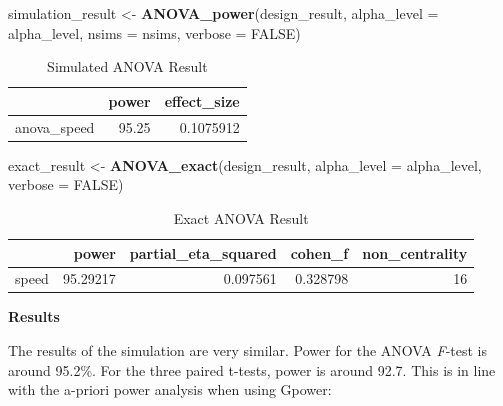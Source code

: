 \documentclass[
]{book}
\newenvironment{Shaded}{\begin{snugshade}}{\end{snugshade}}
\newcommand{\DataTypeTok}[1]{\textcolor[rgb]{0.13,0.29,0.53}{#1}}
\newcommand{\KeywordTok}[1]{\textcolor[rgb]{0.13,0.29,0.53}{\textbf{#1}}}
\newcommand{\NormalTok}[1]{#1}
\newcommand{\OtherTok}[1]{\textcolor[rgb]{0.56,0.35,0.01}{#1}}
\newcommand{\StringTok}[1]{\textcolor[rgb]{0.31,0.60,0.02}{#1}}
\begin{document}
\begin{Shaded}
\begin{Highlighting}[]
\NormalTok{simulation_result <-}\StringTok{ }\KeywordTok{ANOVA_power}\NormalTok{(design_result, }
                                 \DataTypeTok{alpha_level =}\NormalTok{ alpha_level, }
                                 \DataTypeTok{nsims =}\NormalTok{ nsims,}
                                 \DataTypeTok{verbose =} \OtherTok{FALSE}\NormalTok{)}
\end{Highlighting}
\end{Shaded}

\begin{table}[!h]

\caption{\label{tab:unnamed-chunk-340}Simulated ANOVA Result}
\centering
\begin{tabular}[t]{l|r|r}
\hline
  & power & effect\_size\\
\hline
anova\_speed & 95.25 & 0.1075912\\
\hline
\end{tabular}
\end{table}

\begin{Shaded}
\begin{Highlighting}[]
\NormalTok{exact_result <-}\StringTok{ }\KeywordTok{ANOVA_exact}\NormalTok{(design_result,}
                            \DataTypeTok{alpha_level =}\NormalTok{ alpha_level,}
                            \DataTypeTok{verbose =} \OtherTok{FALSE}\NormalTok{)}
\end{Highlighting}
\end{Shaded}

\begin{table}[!h]

\caption{\label{tab:unnamed-chunk-342}Exact ANOVA Result}
\centering
\begin{tabular}[t]{l|r|r|r|r}
\hline
  & power & partial\_eta\_squared & cohen\_f & non\_centrality\\
\hline
speed & 95.29217 & 0.097561 & 0.328798 & 16\\
\hline
\end{tabular}
\end{table}

\textbf{Results}

The results of the simulation are very similar. Power for the ANOVA \emph{F}-test is around 95.2\%. For the three paired t-tests, power is around 92.7. This is in line with the a-priori power analysis when using Gpower:
\end{document}

